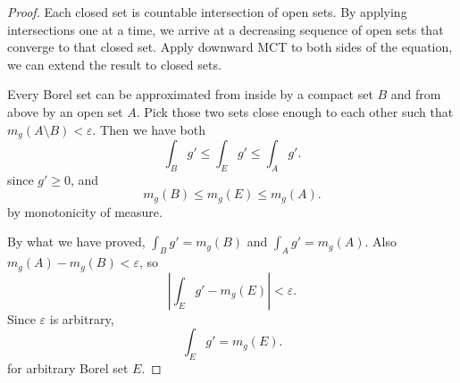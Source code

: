 \begin{itemize}
\begin{proof}
	Each closed set is countable intersection of open sets. By applying intersections one at a time, we arrive at a decreasing sequence of open sets that converge to that closed set. Apply downward MCT to both sides of the equation, we can extend the result to closed sets.

	Every Borel set can be approximated from inside by a compact set $B$ and from above by an open set $A$. Pick those two sets close enough to each other such that $m_g(A \setminus B) < \varepsilon$. Then we have both
	\[
		\int _B g' \le \int _E g' \le \int _A g'
	.\] 
	since $g' \ge 0$, and
	\[
		m_g(B) \le m_g(E) \le m_g(A)
	.\] 
	by monotonicity of measure.

	By what we have proved, $\int _B g' = m_g(B)$ and $\int _A g' = m_g (A)$. Also $m_g(A) - m_g(B) < \varepsilon$, so
	\[
		\left| \int _E g' - m_g(E) \right| <  \varepsilon
	.\] 
	Since $\varepsilon$ is arbitrary, 
	\[
		\int _E g'  = m_g (E)
	.\] 
	for arbitrary Borel set $E$.
	

\end{proof}

\end{itemize}

